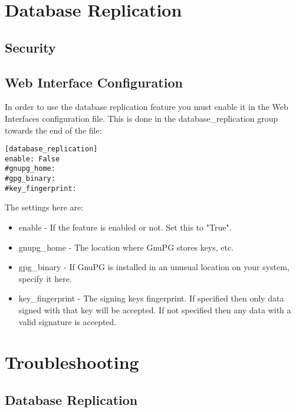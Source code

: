 \documentclass[a4paper,10pt,draft]{book}
\newcommand{\partnumber}{\ifthenelse{\isundefined{\projectnum}}{}{\projectnum-\docnum	\ifthenelse{\equal{\docrev}{001}}{}{.\docrev}}}
\begin{document}
\chapter{Database Replication}
\label{cha_db_replication}

\section{Security}

\section{Web Interface Configuration}

In order to use the database replication feature you must enable it in the Web Interfaces configuration file. This is done in the database\_replication group towards the end of the file:
\begin{verbatim}
[database_replication]
enable: False
#gnupg_home:
#gpg_binary:
#key_fingerprint:
\end{verbatim}

The settings here are:
\begin{itemize}
\item enable - If the feature is enabled or not. Set this to "True".
\item gnupg\_home - The location where GnuPG stores keys, etc.
\item gpg\_binary - If GnuPG is installed in an unusual location on your system, specify it here.
\item key\_fingerprint - The signing keys fingerprint. If specified then only data signed with that key will be accepted. If not specified then any data with a valid signature is accepted.
\end{itemize}

\chapter{Troubleshooting}

\section{Database Replication}


\newpage
\thispagestyle{empty}
\begin{flushright}
\null
\vfill
\tt \partnumber
\end{flushright}
\end{document}
